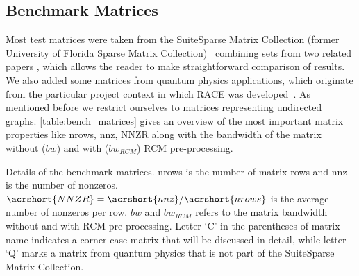 \subsection{Benchmark Matrices}
Most test matrices were taken from the Suite\-Sparse Matrix Collection (former University of Florida Sparse Matrix Collection)~\cite{UOF} combining sets from two related papers \cite{RSB,park_ls}, which allows the reader to make straightforward comparison of results.  We also added some matrices from quantum physics applications, which originate from the particular project context in which RACE was developed~\cite{ESSEX}.
As mentioned before we restrict ourselves to matrices representing undirected graphs.
\cref{table:bench_matrices} gives an overview of the most important matrix properties like \acrfull{nrows}, \acrfull{nnz}, \acrfull{NNZR} along with the bandwidth of the matrix without ($bw$) and with ($bw_{RCM}$) \acrshort{RCM} pre-processing.
\begin{table}[tb]
	\footnotesize
	\caption{Details of the benchmark matrices. \acrshort{nrows} is the number of matrix rows and \acrshort{nnz} is the number of nonzeros. $\acrshort{NNZR}=\acrshort{nnz}/\acrshort{nrows}$ is the average number of nonzeros per row. $bw$ and $bw_{RCM}$ refers to the matrix bandwidth without and with \acrshort{RCM} pre-processing. Letter `C' in the parentheses of matrix name indicates a corner case matrix that will be discussed in detail, while letter `Q' marks a matrix from quantum physics that is not part of the SuiteSparse Matrix Collection.} \label{tab:test_mtx}
	\label{table:bench_matrices}
	\begin{center}
		
	\end{center}
\end{table}

%		

%		

